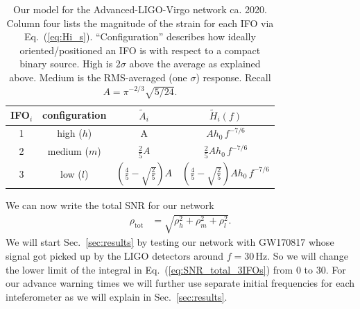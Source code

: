 \documentclass[amsmath,amssymb,aps,floats,amsfonts,notitlepage,superscriptaddress,eqsecnum,nofootinbib,10pt]{revtex4-1}
\newcommand{\nn}{\nonumber}
\newcommand{\f}{\frac}
\newcommand\T{\rule{0pt}{2.6ex}}       %
\newcommand\B{\rule[-1.2ex]{0pt}{0pt}} %
\begin{document}
\begin{table}[h]
\centering
\begin{tabular}{c|c|c|c}
 IFO$_i$ & configuration %
 & $\tilde{A}_i$ & $\tilde{H}_i(f)$\\
 \hline
 1 & high ($h$) &  A & $A h_0\, f^{-7/6}$ \T\\
 2 & medium ($m$) & $\tfrac{2}{5}A$ & $ \tfrac{2}{5}A h_0 \, f^{-7/6}$\B\T \\
 3 & low ($l$)  & $\left(\tfrac{4}{5}-\sqrt{\tfrac{2}{5}}\right)A$ & $ \left(\tfrac{4}{5}-\sqrt{\tfrac{2}{5}}\right)A h_0 \, f^{-7/6}$\B \\
 \hline
\end{tabular}
\caption{%
Our model for the Advanced-LIGO-Virgo network ca. 2020. %
Column four lists the magnitude of the strain for each IFO via Eq.~(\ref{eq:Hi_s}).
``Configuration'' describes how ideally oriented/positioned an IFO is with respect to a compact binary source. 
High is $2\sigma$ above the average as explained above.
Medium is the RMS-averaged (one $\sigma$) response. Recall $A= \pi^{-2/3} \sqrt{5/24}$. 
}\label{table:network_params}
\end{table}
%
%
We can now write the total SNR for our network
%
\begin{align}
\rho_\text{tot} &= \sqrt{\rho^2_h+\rho^2_m+\rho^2_l} \label{eq:SNR_total_3IFOs} .
\end{align}
%
We will start Sec.~\ref{sec:results} by testing our network with GW170817 whose signal got picked up by the LIGO detectors around $f=30$\,Hz.
So we will change the lower limit of the integral in Eq.~(\ref{eq:SNR_total_3IFOs}) from $0$ to $30$.
For our advance warning times we will further use separate initial frequencies for each inteferometer as we will explain in Sec.~\ref{sec:results}.
\end{document}
